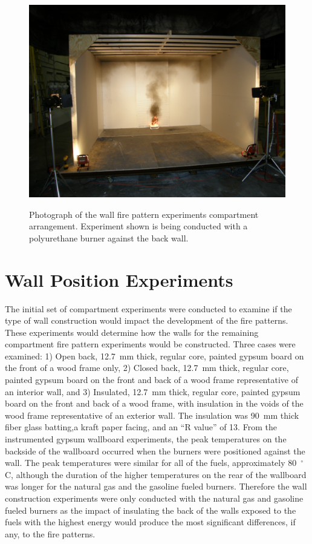 \documentclass[twoside]{uocthesis}
\begin{document}
\begin{figure}[ht!]
\includegraphics[width=\columnwidth]{../Figures/Compartment_Test} \\
	\caption[Photograph of the wall fire pattern experiments compartment arrangement]{Photograph of the wall fire pattern experiments compartment arrangement.  Experiment shown is being conducted with a polyurethane burner against the back wall.}
	\label{Compartment_Test}
\end{figure}


\section{Wall Position Experiments}

 The initial set of compartment experiments were conducted to examine if the type of wall construction would impact the development of the fire patterns. These experiments would determine how the walls for the remaining compartment fire pattern experiments would be constructed.  Three cases were examined: 1) Open back, 12.7~mm thick, regular core, painted gypsum board on the front of a wood frame only, 2) Closed back, 12.7~mm thick, regular core, painted gypsum board on the front and back of a wood frame representative of an interior wall, and 3) Insulated, 12.7~mm thick, regular core, painted gypsum board on the front and back of a wood frame, with insulation in the voids of the wood frame representative of an exterior wall. The insulation was 90~mm thick fiber glass batting,a kraft paper facing, and an ``R value'' of 13.  From the instrumented gypsum wallboard experiments, the peak temperatures on the backside of the wallboard occurred when the burners were positioned against the wall.  The peak temperatures were similar for all of the fuels, approximately 80~$^\circ$C, although the duration of the higher temperatures on the rear of the wallboard was longer for the natural gas and the gasoline fueled burners. Therefore the wall construction experiments were only conducted with the natural gas and gasoline fueled burners as the impact of insulating the back of the walls exposed to the fuels with the highest energy would produce the most significant differences, if any, to the fire patterns.
\end{document}
